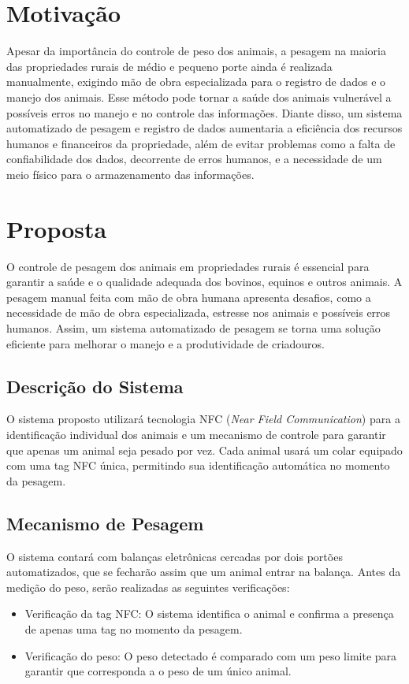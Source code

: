 \documentclass[11pt]{article}
\begin{document}
\section{Motivação}
Apesar da importância do controle de peso dos animais, a pesagem na maioria das propriedades rurais de médio e pequeno porte ainda é realizada manualmente, exigindo mão de obra especializada para o registro de dados e o manejo dos animais. Esse método pode tornar a saúde dos animais vulnerável a possíveis erros no manejo e no controle das informações. Diante disso, um sistema automatizado de pesagem e registro de dados aumentaria a eficiência dos recursos humanos e financeiros da propriedade, além de evitar problemas como a falta de confiabilidade dos dados, decorrente de erros humanos, e a necessidade de um meio físico para o armazenamento das informações.

\section{Proposta}
O controle de pesagem dos animais em propriedades rurais é essencial para garantir a saúde e o qualidade adequada dos bovinos, equinos e outros animais. A pesagem manual feita com mão de obra humana apresenta desafios, como a necessidade de mão de obra especializada, estresse nos animais e possíveis erros humanos. Assim, um sistema automatizado de pesagem se torna uma solução eficiente para melhorar o manejo e a produtividade de criadouros.

\subsection{Descrição do Sistema}
O sistema proposto utilizará tecnologia NFC (\textit{Near Field Communication}) para a identificação individual dos animais e um mecanismo de controle para garantir que apenas um animal seja pesado por vez. Cada animal usará um colar equipado com uma tag NFC única, permitindo sua identificação automática no momento da pesagem.

\subsection{Mecanismo de Pesagem}
O sistema contará com balanças eletrônicas cercadas por dois portões automatizados, que se fecharão assim que um animal entrar na balança. Antes da medição do peso, serão realizadas as seguintes verificações:

\begin{itemize}
    \item Verificação da tag NFC: O sistema identifica o animal e confirma a presença de apenas uma tag no momento da pesagem.
    \item Verificação do peso: O peso detectado é comparado com um peso limite para garantir que corresponda a o peso de um único animal.
\end{itemize}
\end{document}
